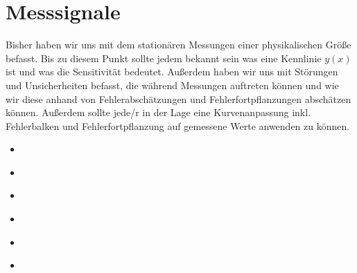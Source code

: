\documentclass[letterpaper,10pt,english]{jupyterBook}
\begin{document}
\sphinxAtStartPar
{}

\sphinxstepscope


\chapter{Messsignale}
\label{\detokenize{content/3_Messsignale:messsignale}}\label{\detokenize{content/3_Messsignale::doc}}
\sphinxAtStartPar
Bisher haben wir uns mit dem stationären Messungen einer physikalischen Größe befasst. Bis zu diesem Punkt sollte jedem bekannt sein was eine Kennlinie \(y(x)\) ist und was die Sensitivität bedeutet. Außerdem haben wir uns mit Störungen und Unsicherheiten befasst, die während Messungen auftreten können und wie wir diese anhand von Fehlerabschätzungen und Fehlerfortpflanzungen abschätzen können. Außerdem sollte jede/r in der Lage eine Kurvenanpassung inkl. Fehlerbalken und Fehlerfortpflanzung auf gemessene Werte anwenden zu können.
\begin{itemize}
\item {} 
\sphinxAtStartPar
{\hyperref[\detokenize{content/3_basics::doc}]{}}

\item {} 
\sphinxAtStartPar
{\hyperref[\detokenize{content/3_Kenngroessen::doc}]{}}

\item {} 
\sphinxAtStartPar
{\hyperref[\detokenize{content/3_Modulationen::doc}]{}}

\item {} 
\sphinxAtStartPar
{\hyperref[\detokenize{content/2_Digital::doc}]{}}

\item {} 
\sphinxAtStartPar
{\hyperref[\detokenize{content/3_FourierAnalyse::doc}]{}}

\item {} 
\sphinxAtStartPar
{\hyperref[\detokenize{content/3_Rauschen::doc}]{}}

\end{itemize}

\sphinxstepscope
\end{document}
